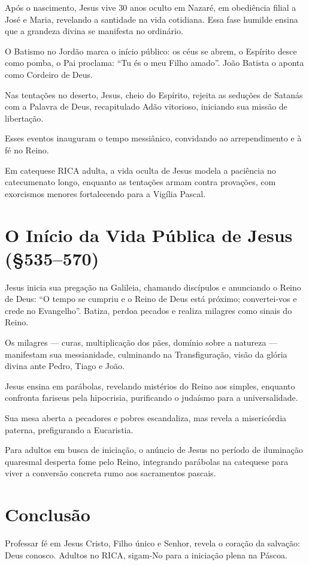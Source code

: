 Após o nascimento, Jesus vive 30 anos oculto em Nazaré, em obediência filial a José e Maria, revelando a santidade na vida cotidiana. Essa fase humilde ensina que a grandeza divina se manifesta no ordinário.

O Batismo no Jordão marca o início público: os céus se abrem, o Espírito desce como pomba, o Pai proclama: ``Tu és o meu Filho amado''. João Batista o aponta como Cordeiro de Deus.

Nas tentações no deserto, Jesus, cheio do Espírito, rejeita as seduções de Satanás com a Palavra de Deus, recapitulado Adão vitorioso, iniciando sua missão de libertação.

Esses eventos inauguram o tempo messiânico, convidando ao arrependimento e à fé no Reino.

Em catequese RICA adulta, a vida oculta de Jesus modela a paciência no catecumenato longo, enquanto as tentações armam contra provações, com exorcismos menores fortalecendo para a Vigília Pascal.

\section{O Início da Vida Pública de Jesus (\S 535--570)}

Jesus inicia sua pregação na Galileia, chamando discípulos e anunciando o Reino de Deus: ``O tempo se cumpriu e o Reino de Deus está próximo; convertei-vos e crede no Evangelho''. Batiza, perdoa pecados e realiza milagres como sinais do Reino.

Os milagres --- curas, multiplicação dos pães, domínio sobre a natureza --- manifestam sua messianidade, culminando na Transfiguração, visão da glória divina ante Pedro, Tiago e João.

Jesus ensina em parábolas, revelando mistérios do Reino aos simples, enquanto confronta fariseus pela hipocrisia, purificando o judaísmo para a universalidade.

Sua mesa aberta a pecadores e pobres escandaliza, mas revela a misericórdia paterna, prefigurando a Eucaristia.

Para adultos em busca de iniciação, o anúncio de Jesus no período de iluminação quaresmal desperta fome pelo Reino, integrando parábolas na catequese para viver a conversão concreta rumo aos sacramentos pascais.

\section{Conclusão}

Professar fé em Jesus Cristo, Filho único e Senhor, revela o coração da salvação: Deus conosco. Adultos no RICA, sigam-No para a iniciação plena na Páscoa.
